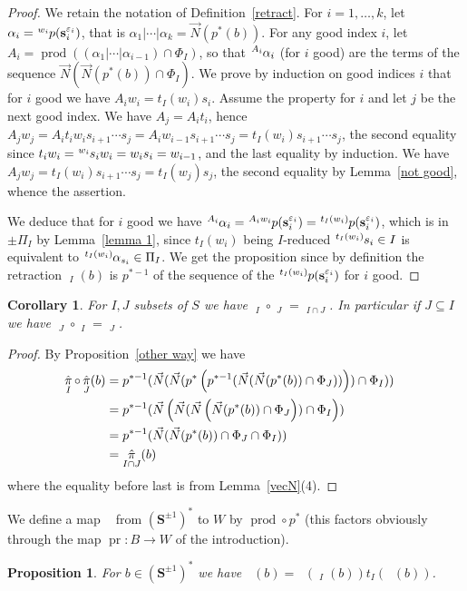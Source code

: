 \documentclass{amsart}
\numberwithin{equation}{section}
\newtheorem{proposition}[equation]{Proposition}
\newtheorem{corollary}[equation]{Corollary}
\newcommand\vN{\vec N}
\newcommand\lexp[2]{\kern\scriptspace\vphantom{#2}^{#1}\kern-\scriptspace#2}
\newcommand\bs{{\mathbf s}}
\newcommand\bS{{\mathbf S}}
\DeclareMathOperator\pr{pr}
\DeclareMathOperator\hpr{\widehat{pr}}
\DeclareMathOperator\hpi{\hat\pi}
\DeclareMathOperator\product{prod}
\begin{document}
\begin{proof}
We retain the notation of Definition~\ref{retract}.
For $i=1,\ldots,k$, let $\alpha_i=\lexp{w_i}p(\bs_i^{\varepsilon_i})$, that is $\alpha_1|\cdots|
\alpha_k=\vN(p^*(b))$. For any good index $i$, let
$A_i= \product((\alpha_1|\cdots|\alpha_{i-1})\cap \Phi_I)$,
so that $\lexp {A_i}\alpha_i$ (for $i$ good) are the
terms of the sequence $\vN(\vN(p^*(b))\cap \Phi_I)$.
We prove by induction on good indices $i$ that for $i$ good we have $A_iw_i=
t_I(w_i)s_i$. Assume the property for $i$ and let $j$ be the next good index.
We have $A_j=A_it_i$, hence $A_jw_j=A_it_iw_is_{i+1}\cdots
s_j=A_iw_{i-1}s_{i+1}\cdots s_j=t_I(w_i)s_{i+1}\cdots s_j$, the second
equality since $t_iw_i=\lexp{w_i}s_i w_i=w_is_i=w_{i-1}$, and the last equality
by induction. We have $A_jw_j=t_I(w_i)
s_{i+1}\cdots s_j=t_I(w_j)s_j$, the second equality by Lemma~\ref{not good},
whence the assertion.

We deduce that for $i$ good we have $\lexp{A_i}\alpha_i=\lexp
{A_iw_i}p(\bs_i^{\varepsilon_i})=     \lexp{t_I(w_i)}p(\bs_i^{\varepsilon_i})$,
which is in $\pm\Pi_I$ by Lemma~\ref{lemma 1}, since ${t_I(w_i)}$ being
$I$-reduced $\lexp{t_I(w_i)} s_i\in I$ is equivalent to
$\lexp{t_I(w_i)}\alpha_{s_i}\in\Pi_I$.
We get the
proposition since by definition the
retraction $\hpi_I(b)$ is $p^{*-1}$ of the sequence  of the
$\lexp{t_I(w_i)}p(\bs_i^{\varepsilon_i})$ for $i$ good.
\end{proof}
\begin{corollary} \label{transitivity} For $I,J$ subsets of $S$ we have
$\hpi_I\circ\hpi_J=\hpi_{I\cap J}$. In particular if $J\subseteq I$ we
have $\hpi_J\circ\hpi_I=\hpi_J$.
\end{corollary}
\begin{proof}
 By Proposition~\ref{other way} we have
 $$\begin{aligned}\hpi_I\circ\hpi_J(b)&=
  p^{*-1}(\vN(\vN(p^*\left (p^{*-1}(\vN(\vN(p^*(b))\cap \Phi_J))\right ))\cap
  \Phi_I))\cr
  &=p^{*-1}(\vN\left (\vN(\vN\left (\vN(p^*(b))\cap \Phi_J\right))\cap \Phi_I\right))\cr
  &=p^{*-1}(\vN(\vN(p^*(b))\cap \Phi_J\cap \Phi_I))\cr
  &=\hpi_{I\cap J}(b)
 \end{aligned}
 $$
 where the equality before last is from Lemma~\ref{vecN}(4).
\end{proof}
We  define  a  map \index{pr@$\hpr$} $\hpr$  from  $(\bS^{\pm1})^*$  to  $W$ by
$\product\circ p^*$ (this factors obviously through the map $\pr:B\to W$ of
the introduction).
\begin{proposition}\label{prtI}
For $b\in (\bS^{\pm1})^*$ we have $\hpr(b)=\hpr(\hpi_I(b))t_I(\hpr(b))$.
\end{proposition}
\end{document}
